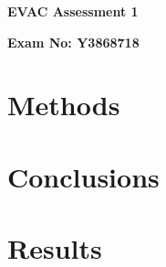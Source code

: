 \documentclass[12pt]{article}
\begin{document}
\begin{titlepage}
\begin{center}
\vspace*{1cm}
\Huge
\textbf{EVAC Assessment 1}
\vspace{1.5cm}
\Large

\textbf{Exam No: Y3868718}
\vfill
\end{center}
\end{titlepage}
\section{Methods}

\pagebreak
\section{Conclusions}

\pagebreak
\section{Results}

\pagebreak
\printbibliography
\end{document}
